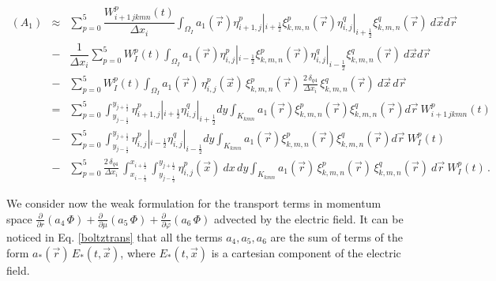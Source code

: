\documentclass[11pt]{article}
\newcommand{\ot}{\frac{1}{2}}
\begin{document}
{\small
\begin{eqnarray*}
(A_{1})
&
\approx
&
\sum_{p=0}^{5} 
\dfrac{W_{i+1 \, jkmn}^p(t)}{\Delta x_{i}}
\int_{\Omega_{I}} 
a_{1}(\vec{r}) \eta^{p}_{i+1,j}|_{i + \ot} \xi^{p}_{k,m,n}(\vec{r})
\eta^{q}_{i,j}|_{i + \ot} \xi^{q}_{k,m,n}(\vec{r}) \:
d\vec{x} d\vec{r}
\\
& - &
\dfrac{1}{\Delta x_{i}}
\sum_{p=0}^{5} W_{I}^p (t)
\int_{\Omega_{I}} 
a_{1}(\vec{r})  \eta^{p}_{i,j}|_{i - \ot}  \xi^{p}_{k,m,n}(\vec{r}) 
\eta^{q}_{i,j}|_{i - \ot} \xi^{q}_{k,m,n}(\vec{r}) \:
d\vec{x} d\vec{r}
\\
& -  &
\sum_{p=0}^{5} W_{I}^p (t)
\int_{\Omega_{I}}
a_{1}(\vec{r}) \, \eta^{p}_{i,j}(\vec{x}) \, \xi^{p}_{k,m,n}(\vec{r}) \,
\frac{2 \, \delta_{q 4}}{\Delta x_{i}} \, \xi^{q}_{k,m,n}(\vec{r}) \: 
d\vec{x} \, d\vec{r}  
\\
& = &
\sum_{p=0}^{5} 
\int_{y_{j - \ot}}^{y_{j + \ot}}
 \eta^{p}_{i+1,j}|_{i + \ot}  \eta^{q}_{i,j}|_{i + \ot}  dy
\int_{K_{kmn}}
a_{1}(\vec{r})  \xi^{p}_{k,m,n}(\vec{r}) 
 \xi^{q}_{k,m,n}(\vec{r}) d\vec{r}
\:
W_{i+1 \, jkmn}^p(t)
\\
& -  &
\sum_{p=0}^{5} 
\int_{y_{j - \ot}}^{y_{j + \ot}}
 \eta^{p}_{i,j}|_{i - \ot}  \eta^{q}_{i,j}|_{i - \ot}  dy
\int_{K_{kmn}}
a_{1}(\vec{r})  \xi^{p}_{k,m,n}(\vec{r}) 
 \xi^{q}_{k,m,n}(\vec{r})  d\vec{r}
\:
W_{I}^p (t)
\\
& - &
\sum_{p=0}^{5} 
\frac{2 \, \delta_{q 4}}{\Delta x_{i}} \,
\int_{x_{i - \ot}}^{x_{i + \ot}}
\int_{y_{j - \ot}}^{y_{j + \ot}}
 \eta^{p}_{i,j}(\vec{x}) \:dx \, dy
\int_{K_{kmn}}
a_{1}(\vec{r}) \, \xi^{p}_{k,m,n}(\vec{r}) \,
 \xi^{q}_{k,m,n}(\vec{r}) \: d\vec{r} 
\:
W_{I}^p (t) \, .
\end{eqnarray*}
}
%






We consider now the weak formulation for the transport terms in momentum space 
$
\frac{\partial \mbox{}}{\partial r} \left( a_{4} \, \Phi \right)  + \frac{\partial \mbox{ }}{\partial \mu} \left( a_{5} \,
\Phi \right) + \frac{\partial \mbox{ }}{\partial \varphi} \left(
a_{6} \, \Phi \right) 
$
advected by the electric field. It can be noticed in Eq.
\ref{boltztrans}
that all the terms $a_4, a_5, a_6$ are the sum of terms of the form 
$a_{*}(\vec{r}) \, E_{*}(t,\vec{x})$,
where
$E_{*}(t,\vec{x})$ is a cartesian component of the electric field. 
\end{document}
